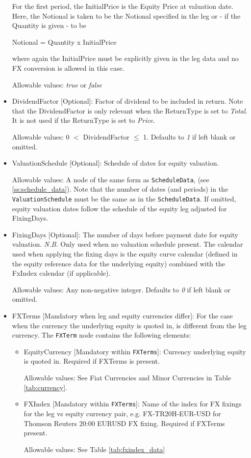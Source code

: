 \begin{itemize}
For the first period, the InitialPrice is the Equity Price at valuation date.
Here, the Notional is taken to be the Notional specified in the leg or - if the Quantity is given - to be

  Notional = Quantity x InitialPrice

  where again the InitialPrice must be explicitly given in the leg data and no FX conversion is allowed in this case.

  Allowable values:  \emph{true} or  \emph{false}

\item DividendFactor [Optional]: Factor of dividend to be included in return. Note that the DividendFactor is only relevant when the ReturnType is set to  \emph{Total}. It is not used if the ReturnType is set to \emph{Price}.

Allowable values: 0 $<$ DividendFactor $\leq$  1.   Defaults to \emph{1} if left blank or omitted.

\item ValuationSchedule [Optional]: Schedule of dates for equity valuation.

Allowable values: A node of the same form as \lstinline!ScheduleData!, (see \ref{ss:schedule_data}). Note that the number of dates (and periods) in the \lstinline!ValuationSchedule! must be the same as in the \lstinline!ScheduleData!.  If omitted, equity valuation dates follow the schedule of the equity leg adjusted for FixingDays.

\item FixingDays [Optional]: The number of days before payment date for equity valuation. \emph{N.B.} Only used when no valuation schedule present. The calendar used when applying the fixing days is the equity curve calendar (defined in the equity reference data for the underlying equity) combined with the FxIndex calendar (if applicable).

Allowable values: Any non-negative integer. Defaults to \emph{0} if left blank or omitted.

\item FXTerms [Mandatory when leg and equity currencies differ]: For the case when the currency  the underlying equity is quoted in, is different from the leg currency.  The \lstinline!FXTerm! node contains the following elements:
\begin{itemize}
	\item EquityCurrency [Mandatory within \lstinline!FXTerms!]: Currency underlying equity is quoted in. Required if FXTerms is present.

	Allowable values: See Fiat Currencies and Minor Currencies in Table \ref{tab:currency}.

	\item FXIndex [Mandatory within \lstinline!FXTerms!]: Name of the index for FX fixings for the leg vs equity currency pair, e.g. FX-TR20H-EUR-USD for Thomson Reuters 20:00 EURUSD FX fixing. Required if FXTerms present.

	Allowable values:  See Table \ref{tab:fxindex_data}
\end{itemize}
\end{itemize}

